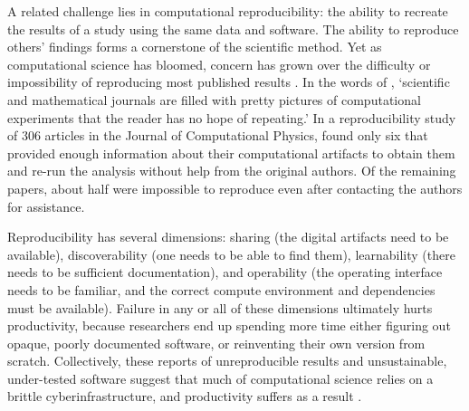 \documentclass[12pt]{amsart}
\begin{document}
A related challenge lies in computational reproducibility: the ability to recreate the results of a study using the same data and software. The ability to reproduce others' findings forms a cornerstone of the scientific method. Yet as computational science has bloomed, concern has grown over the difficulty or impossibility of reproducing most published results \citep[e.g.,][]{schwab2000making,peng2011reproducible,stodden2013setting,barba2016hard,alnoamany2018towards,chen2019open,krafczyk2019scientific}. In the words of \citet{leveque2009python}, `scientific and mathematical journals are filled with pretty pictures of computational experiments that the reader has no hope of repeating.' In a reproducibility study of 306 articles in the Journal of Computational Physics, \citet{stodden2018enabling} found only six that provided enough information about their computational artifacts to obtain them and re-run the analysis without help from the original authors. Of the remaining papers, about half were impossible to reproduce even after contacting the authors for assistance.

Reproducibility has several dimensions: sharing (the digital artifacts need to be available), discoverability (one needs to be able to find them), learnability (there needs to be sufficient documentation), and operability (the operating interface needs to be familiar, and the correct compute environment and dependencies must be available). Failure in any or all of these dimensions ultimately hurts productivity, because researchers end up spending more time either figuring out opaque, poorly documented software, or reinventing their own version from scratch. Collectively, these reports of unreproducible results and unsustainable, under-tested software suggest that much of computational science relies on a brittle cyberinfrastructure, and productivity suffers as a result \citep{wilson2006s,faulk2009scientific,prabhu2011survey}.
\end{document}
